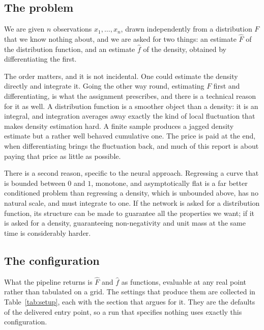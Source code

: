 \documentclass[11pt]{article}
\newcommand{\Fhat}{\widehat{F}}
\newcommand{\fhat}{\widehat{f}}
\begin{document}
\subsection{The problem}

We are given $n$ observations $x_1,\dots,x_n$, drawn independently from a distribution
$F$ that we know nothing about, and we are asked for two things: an estimate $\Fhat$ of the
distribution function, and an estimate $\fhat$ of the density, obtained by differentiating
the first.

The order matters, and it is not incidental. One could estimate the density directly and
integrate it. Going the other way round, estimating $F$ first and differentiating, is
what the assignment prescribes, and there is a technical reason for it as well. A distribution function is a smoother object than a density: it is an integral, and
integration averages away exactly the kind of local fluctuation that makes density
estimation hard. A finite sample produces a jagged density estimate but a rather well
behaved cumulative one. The price is paid at the end, when differentiating brings the
fluctuation back, and much of this report is about paying that price as little as possible.

There is a second reason, specific to the neural approach. Regressing a curve that is
bounded between $0$ and $1$, monotone, and asymptotically flat is a far better conditioned
problem than regressing a density, which is unbounded above, has no natural scale, and must
integrate to one. If the network is asked for a distribution function, its structure can be
made to guarantee all the properties we want; if it is asked for a density, guaranteeing
non-negativity and unit mass at the same time is considerably harder.

\subsection{The configuration}

What the pipeline returns is $\Fhat$ and $\fhat$ as functions, evaluable at any real point
rather than tabulated on a grid. The settings that produce them are collected in
Table~\ref{tab:setup}, each with the section that argues for it. They are the defaults of the
delivered entry point, so a run that specifies nothing uses exactly this configuration.
\end{document}
